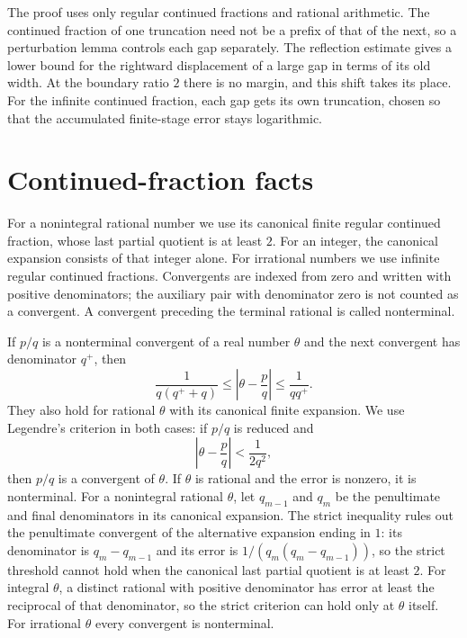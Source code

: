 \documentclass{amsart}
\numberwithin{equation}{section}
\begin{document}
The proof uses only regular continued fractions and rational arithmetic. The
continued fraction of one
truncation need not be a prefix of that of the next, so a perturbation
lemma controls each gap separately. The reflection estimate gives a lower
bound for the rightward displacement of a large gap in terms of its old
width. At the boundary ratio $2$ there is no margin, and this shift takes
its place. For the infinite continued fraction, each gap gets its own
truncation, chosen so that the accumulated finite-stage error stays
logarithmic.

\section{Continued-fraction facts}

For a nonintegral rational number we use its canonical finite regular
continued fraction, whose last partial quotient is at least $2$. For an
integer, the canonical expansion consists of that integer alone.
For irrational numbers we use infinite regular continued fractions.
Convergents are indexed from zero and written with positive denominators;
the auxiliary pair with denominator zero is not counted as a convergent.
A convergent preceding the terminal rational is called nonterminal.

If $p/q$ is a nonterminal convergent of a real number $\theta$ and
the next convergent has denominator $q^+$, then
\begin{equation}\label{eq:CFerror}
\frac1{q(q^++q)}\le\left|\theta-\frac pq\right|
\le\frac1{qq^+}.
\end{equation}
They also hold for rational $\theta$ with its canonical finite
expansion. We use Legendre's criterion in both cases:
if $p/q$ is reduced and
\begin{equation}\label{eq:Legendre}
\left|\theta-\frac pq\right|<\frac1{2q^2},
\end{equation}
then $p/q$ is a convergent of $\theta$. If $\theta$ is rational and
the error is nonzero, it is nonterminal. For a nonintegral rational $\theta$, let $q_{m-1}$ and $q_m$ be the
penultimate and final denominators in its canonical expansion.
The strict inequality rules out the penultimate convergent of the alternative
expansion ending in $1$: its denominator is $q_m-q_{m-1}$ and
its error is $1/(q_m(q_m-q_{m-1}))$, so the strict threshold cannot
hold when the canonical last partial quotient is at least $2$.
For integral $\theta$, a distinct rational with positive denominator has
error at least the reciprocal of that denominator, so the strict criterion
can hold only at $\theta$ itself. For irrational $\theta$ every convergent
is nonterminal.
\end{document}
